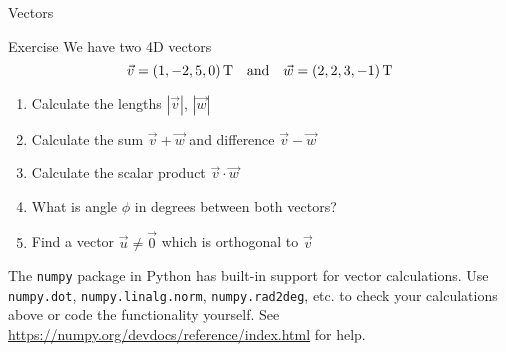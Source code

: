   \begin{frame}{Vectors}
    \begin{exampleblock}{Exercise}
      We have two 4D vectors
      \begin{equation*}
        \vec{v} = \left(1, -2, 5, 0\right)\text{T}
        \quad\text{and}\quad
        \vec{w} = \left(2, 2, 3, -1\right)\text{T}
      \end{equation*}
      \begin{enumerate}
        \item Calculate the lengths $|\vec{v}|$, $|\vec{w}|$
        \item Calculate the sum $\vec{v} + \vec{w}$ and difference $\vec{v} - \vec{w}$
        \item Calculate the scalar product $\vec{v}\cdot \vec{w}$
        \item What is angle $\phi$ in degrees between both vectors?
        \item Find a vector $\vec{u}\neq \vec{0}$ which is orthogonal to $\vec{v}$
      \end{enumerate}
      The \texttt{numpy} package in Python has built-in support for vector
      calculations.
      Use \texttt{numpy.dot}, \texttt{numpy.linalg.norm},
      \texttt{numpy.rad2deg}, etc. to check your calculations above or code the
      functionality yourself.
      See \url{https://numpy.org/devdocs/reference/index.html} for help.
    \end{exampleblock}
  \end{frame}

